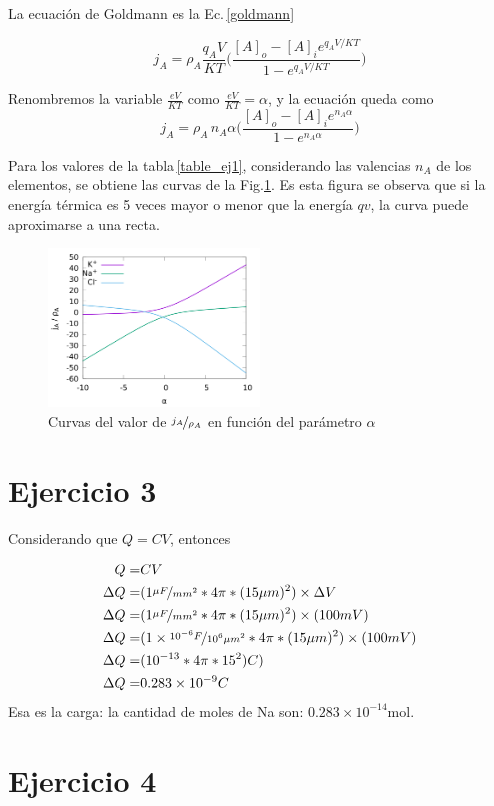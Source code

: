 La ecuación de Goldmann es la Ec.\,\ref{goldmann}

\begin{equation}
		j_A = \rho_A \frac{q_AV}{KT} \bigg(\frac{[A]_o - [A]_i e^{q_A V / KT}}{1 - e^{q_A V / KT} }\bigg)
		\label{goldmann}
\end{equation}

Renombremos la variable $\frac{eV}{KT}$  como $\frac{eV}{KT} = \alpha$, y la ecuación queda como
\begin{equation}
		j_A = \rho_A \, n_A \alpha \bigg(\frac{[A]_o - [A]_i e^{n_A\alpha}}{1 - e^{n_A\alpha} }\bigg)
\end{equation}

Para los valores de la tabla\,\ref{table_ej1}, considerando las valencias $n_A$ de los elementos, se obtiene las curvas de la Fig.\ref{fig:curvas_ej2}. Es esta figura se observa que si la energía térmica es 5 veces mayor o menor que la energía $qv$, la curva puede aproximarse a una recta.

\begin{figure}[H]
	\centering
	\includegraphics[width=0.5\textwidth]{curvas_ej2.png}
	\caption{Curvas del valor de $\nicefrac{j_A}{\rho_A}$ en función del parámetro $\alpha$}
	\label{fig:curvas_ej2}
\end{figure}

\section{Ejercicio 3}

Considerando que $Q=CV$, entonces

\begin{align*}
    Q=&CV\\
    \Delta Q=& (1 \nicefrac{\mu F}{mm^2} * 4\pi * (15 \mu m)^2) \times \Delta V\\
    \Delta Q=& (1 \nicefrac{\mu F}{mm^2} * 4\pi * (15 \mu m)^2) \times (100 mV)\\   
    \Delta Q=& (1 \times \nicefrac{10^{-6} F}{10^6 \mu m^2} * 4\pi * (15 \mu m)^2) \times (100 mV)\\
    \Delta Q=& (10^{-13} * 4\pi * 15^2)C)\\
    \Delta Q=& 0.283 \times 10^{-9}C\\  
\end{align*}
Esa es la carga: la cantidad de moles de Na son: $0.283 \times 10^{-14}$mol.

\section{Ejercicio 4}


